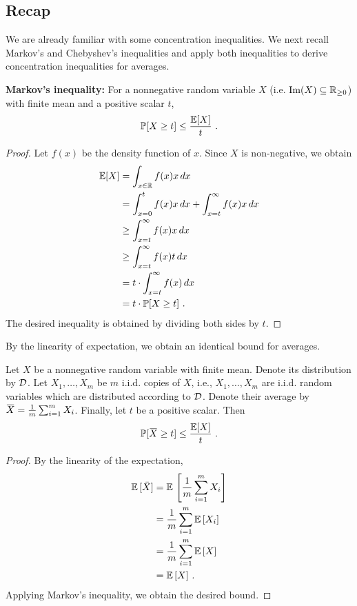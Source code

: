 \documentclass[11pt]{article}
\newcommand{\overbar}[1]{\mkern 1.5mu\overline{\mkern-1.5mu#1\mkern-1.5mu}\mkern 1.5mu}
\begin{document}
\subsection{Recap} \label{sec:recap}
We are already familiar with some concentration inequalities. We next recall Markov's and Chebyshev's inequalities and apply both inequalities to derive concentration inequalities for averages.
\begin{theorem} \textbf{Markov's inequality:} For a nonnegative random
variable $X$ (i.e. $\text{Im}(X) \subseteq \mathbb{R}_{\ge 0}$) with finite mean and a positive scalar $t$,
\[
\operatorname*{\mathbb{P}} [X \geq t] \leq \frac{\mathbb{E}[X]}{t}~.
\]
\end{theorem}
\begin{proof}
Let $f(x)$ be the density function of $x$. Since $X$ is non-negative, we obtain
\begin{align*}
\mathbb{E}[X] &= \int_{x \in \mathbb{R}} f(x) x \,dx \\&
= \int_{x = 0} ^t f(x) x\, dx + \int_{x =t} ^\infty f(x) x \, dx \\&
\ge \int_{x =t} ^\infty f(x) x \,dx \\&
\ge \int_{x =t} ^\infty f(x) t \, dx\\&
= t \cdot \int_{x =t} ^\infty f(x) \,dx \\&
=t \cdot \operatorname*{\mathbb{P}}[X \ge t] ~.
\end{align*}
The desired inequality is obtained by dividing both sides by $t$.
\end{proof}
By the linearity of expectation, we obtain an identical bound for averages.
\begin{corollary} \label{cor:markovAve}
Let $X$ be a nonnegative random variable with finite mean. Denote its distribution by $\mathcal{D}$. Let $X_1,\ldots,X_m$ be $m$ i.i.d. copies of $X$, i.e., $X_1,\ldots,X_m$ are i.i.d. random variables which are distributed according to $\mathcal{D}$. Denote their average by $\overbar{X}=\frac{1}{m} \sum_{i=1} ^m X_i$. Finally, let $t$ be a positive scalar. Then
\[
\prob [\overbar{X} \geq t] \leq \frac{\mathbb{E}[X]}{t}~.
\]
\end{corollary}
\begin{proof}
By the linearity of the expectation,
\begin{align*}
\mathbb{E}\, [\bar{X}] &= \mathbb{E}\, \left[\frac{1}{m} \sum_{i=1} ^m X_i \right] \\&
= \frac{1}{m} \sum_{i=1} ^m \mathbb{E}\,[X_i] \\&
= \frac{1}{m} \sum_{i=1} ^m \mathbb{E}\,[X] \\&
= \mathbb{E}\,[X]~.
\end{align*}
Applying Markov's inequality, we obtain the desired bound.
\end{proof}
\end{document}

